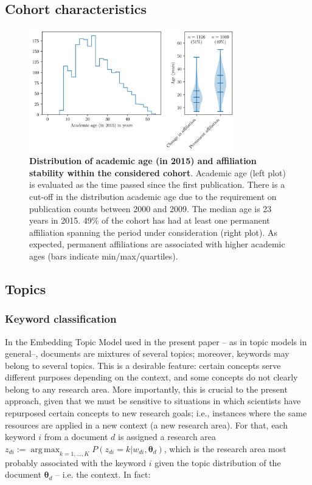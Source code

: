 \documentclass{article}
\DeclareMathOperator*{\argmax}{arg\,max}
\begin{document}
\subsection{\label{appendix:sample_characteristics}Cohort characteristics}

\begin{figure}[H]
    \centering
    \includegraphics[width=0.8\textwidth]{plots/Fig9.png}
    \caption{\textbf{Distribution of academic age (in 2015) and affiliation stability within the considered cohort}.  Academic age (left plot) is evaluated as the time passed since the first publication. There is a cut-off in the distribution academic age due to the requirement on publication counts between 2000 and 2009. The median age is 23 years in 2015. 49\% of the cohort has had at least one permanent affiliation spanning the period under consideration (right plot). As expected, permanent affiliations are associated with higher academic ages (bars indicate min/max/quartiles). }
    \label{fig:sample_characteristics}
\end{figure}

\subsection{\label{appendix:topics}Topics}

\subsubsection{\label{appendix:keywords}Keyword classification}

In the Embedding Topic Model used in the present paper -- as in topic models in general--, documents are mixtures of several topics; moreover, keywords may belong to several topics. This is a desirable feature: certain concepts serve different purposes depending on the context, and some concepts do not clearly belong to any research area. More importantly, this is crucial to the present approach, given that we must be sensitive to situations in which scientists have repurposed certain concepts to new research goals; i.e., instances where the same resources are applied in a new context (a new research area).
For that, each keyword $i$ from a document $d$ is assigned a research area $z_{di} := \argmax_{k=1,\dots,K} P(z_{di}=k|w_{di},\bm{\theta}_{d})$, which is the research area most probably associated with the keyword $i$ given the topic distribution of the document $\bm{\theta}_d$ -- i.e. the context. In fact:
\end{document}
